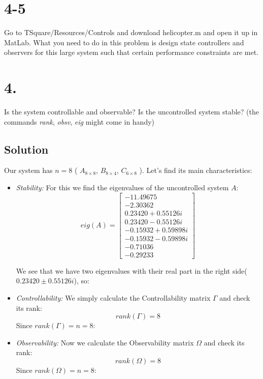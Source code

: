 \documentclass[10pt,a4paper]{article}
\begin{document}
 
\section*{4-5}
Go to TSquare/Resources/Controls and download helicopter.m and open it up in MatLab. What you need to do in this problem is design state controllers and observers for this large system such that certain performance constraints are met.


\section*{4.}
Is the system controllable and observable? Is the uncontrolled system stable? (the commands \textit{rank}, \textit{obsv}, \textit{eig} might come in handy)

\subsection*{Solution}
Our system has $n=8$ ( $A_{8 \times 8}$, $B_{8 \times 4}$, $C_{6 \times 8}$ ). Let's find its main characteristics:

\begin{itemize} 
\item{\textit{Stability:} For this we find the eigenvalues of the uncontrolled system $A$:
\[ eig(A) = \begin{bmatrix} 
  -11.49675 \\ 
  -2.30362 \\
   0.23420 +  0.55126i \\
   0.23420 - 0.55126i \\ 
  -0.15932 +  0.59898i \\
  -0.15932 - 0.59898i \\
  -0.71036 \\ 
  -0.29233
  \end{bmatrix} \]

We see that we have two eigenvalues with their real part in the right side( $0.23420 \pm 0.55126i$), so:
\begin{center}
\end{center}
}
\item{\textit{Controllability:} We simply calculate the Controllability matrix $\Gamma$ and check its rank:
\[ rank(\Gamma) = 8 \]
Since $rank(\Gamma) = n = 8$: 

\begin{center}
\end{center} }

\item{\textit{Observability:} Now we calculate the Observability matrix $\Omega$ and check its rank:
\[ rank(\Omega) = 8 \]
Since $rank(\Omega) = n = 8$: 
\begin{center}
\end{center} }
\end{itemize}
\end{document}
